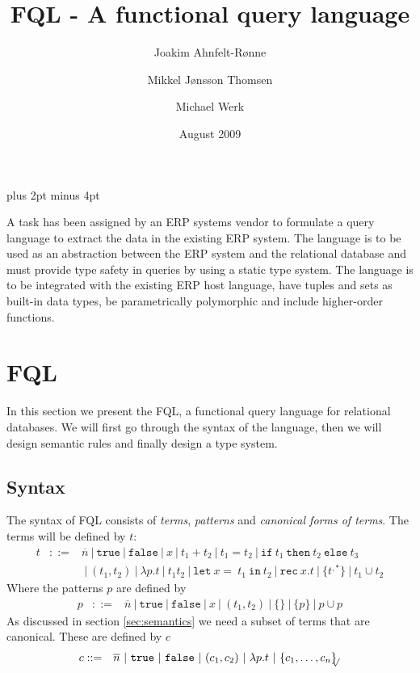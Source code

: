 \documentclass[a4paper]{article}
\title{FQL - A functional query language}
\date{August 2009}
\author{Joakim Ahnfelt-Rønne \and Mikkel Jønsson Thomsen \and Michael Werk}
\newcommand{\pipe}{\ | \ }
\newcommand{\s}[1]{\mathtt{#1}}
\newcommand{\sn}{\overline{n}}
\newcommand{\sLb}{\s{\{}}
\newcommand{\sRb}{\s{\}}}
\newcommand{\sif}{\s{if\ }}
\newcommand{\sthen}{\s{\ then\ }}
\newcommand{\selse}{\s{\ else\ }}
\newcommand{\sifthenelse}[3]{\sif #1 \sthen #2 \selse #3}
\newcommand{\sletin}[2]{\s{let\ } #1 \s{\ in\ } #2}
\newcommand{\srec}{\s{rec\ }}
\newcommand{\strue}{\s{true}}
\newcommand{\sfalse}{\s{false}}
\newcommand{\seq}{\s{=\ }}
\newcommand{\sset}[1]{\sLb #1 \sRb}
\newcommand{\ssetc}[1]{\sset{#1}_{\!\!\!\surd}}
\begin{document}
\parindent=0pt
\parskip=8pt plus 2pt minus 4pt
\maketitle

A task has been assigned by an ERP systems vendor to formulate a query language to extract the data in the existing ERP system. The language is to be used as an abstraction between the ERP system and the relational database and must provide type safety in queries by using a static type system. The language is to be integrated with the existing ERP host language, have tuples and sets as built-in data types, be parametrically polymorphic and include higher-order functions.


\section{FQL}
In this section we present the FQL, a functional query language for relational databases. We will first go through the syntax of the language, then we will design semantic rules and finally design a type system.

\subsection{Syntax}
The syntax of FQL consists of \emph{terms}, \emph{patterns} and \emph{canonical forms of terms}. The terms will be defined by $t$:
\begin{eqnarray*}
t & ::= & \sn \pipe \strue \pipe \sfalse \pipe x \pipe t_1 + t_2 \pipe t_1
= t_2 \pipe \sifthenelse{t_1}{t_2}{t_3} \\
& & \pipe (t_1,
t_2) \pipe \lambda p.t \pipe t_1 t_2 \pipe \sletin{x \seq t_1}{t_2}
\pipe \srec x.t \pipe \sset{t^{,*}} \pipe t_1 \cup t_2
\end{eqnarray*}
Where the patterns $p$ are defined by
\begin{eqnarray*}
p & ::= & \sn \pipe \strue \pipe \sfalse \pipe x \pipe (t_1, t_2) \pipe
\sset{} \pipe \sset{p} \pipe p \cup p
\end{eqnarray*}
As discussed in section \ref{sec:semantics} we need a subset of terms that are canonical. These are defined by $c$
\begin{eqnarray*}
c & ::= & \sn \pipe \strue \pipe \sfalse \pipe (c_1, c_2) \pipe \lambda
p.t \pipe \ssetc{c_1,\ldots,c_n}
\end{eqnarray*}
\end{document}
